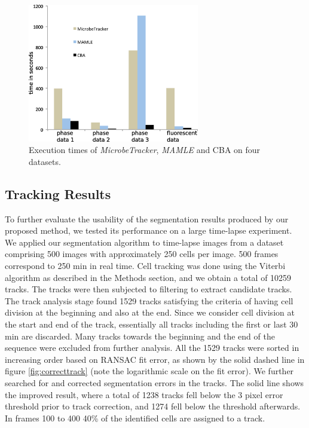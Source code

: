 \documentclass[journal]{IEEEtran}
\begin{document}
\begin{figure}[h]
	\begin{center}
		
		\includegraphics[width=7.5cm]{timingrgb.png}					
		\caption{Execution times of \textit{MicrobeTracker}, \textit{MAMLE} and CBA on four datasets.}
		\label{fig:timing}
	\end{center}
\end{figure}
\subsection{Tracking Results}
To further evaluate the usability of the segmentation results produced by our proposed method, we tested its performance on a large time-lapse experiment. We applied our segmentation algorithm to time-lapse images from a dataset comprising 500 images with approximately 250 cells per image. 500 frames correspond to 250 min in real time. Cell tracking was done using the Viterbi algorithm as described in the Methods section, and we obtain a total of 10259 tracks. The tracks were then subjected to filtering to extract candidate tracks. The track analysis stage found 1529 tracks satisfying the criteria of having cell division at the beginning and also at the end. Since we consider cell division at the start and end of the track, essentially all tracks including the first or last 30 min are discarded. Many tracks towards the beginning and the end of the sequence were excluded from further analysis. All the 1529 tracks were sorted in increasing order based on RANSAC fit error, as shown by the solid dashed line in figure \ref{fig:correcttrack} (note the logarithmic scale on the fit error). We further searched for and corrected segmentation errors in the tracks. The solid line shows the improved result, where a total of 1238 tracks fell below the 3 pixel error threshold prior to track correction, and 1274 fell below the threshold afterwards.  In frames 100 to 400 40\% of the identified cells are assigned to a track. 
\end{document}
